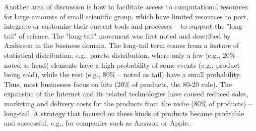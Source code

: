 Another area of discussion is how to facilitate access to computational resources for large amounts of small scientific group, which have limited resources to port, integrate or customize their current tools and processes -- to support the "long-tail" of science. The "long-tail" movement was first noted and described by Anderson \cite{Anderson2006} in the business domain. %
The long-tail term comes from a feature of statistical distribution, e.g., pareto distribution, where only a few (e.g., 20\% -- noted as head) elements have a high probability of some events (e.g., product being sold), while the rest (e.g., 80\% -- noted as tail) have a small probability. Thus, most businesses focus on hits (20\% of products, the 80-20 rule). The expansion of the Internet and its related technologies have caused reduced sales, marketing and delivery costs for the products from the niche (80\% of products) -- long-tail. A strategy that focused on these kinds of products became profitable and successful, e.g., for companies such as Amazon or Apple.\cite{Anderson2006}. 

